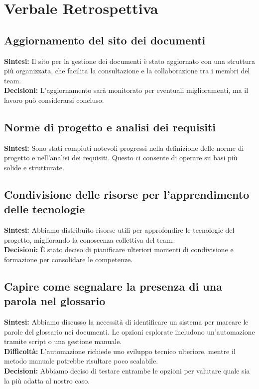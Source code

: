 \documentclass{article}
\begin{document}
\newpage
\section{Verbale Retrospettiva}

    \subsection{Aggiornamento del sito dei documenti}
    \textbf{Sintesi:} Il sito per la gestione dei documenti è stato aggiornato con una struttura più organizzata, che facilita la consultazione e la collaborazione tra i membri del team. \\
    \textbf{Decisioni:} L'aggiornamento sarà monitorato per eventuali miglioramenti, ma il lavoro può considerarsi concluso. 

    \subsection{Norme di progetto e analisi dei requisiti}
    \textbf{Sintesi:} Sono stati compiuti notevoli progressi nella definizione delle norme di progetto e nell’analisi dei requisiti. Questo ci consente di operare su basi più solide e strutturate. \\

    \subsection{Condivisione delle risorse per l'apprendimento delle tecnologie}
    \textbf{Sintesi:} Abbiamo distribuito risorse utili per approfondire le tecnologie del progetto, migliorando la conoscenza collettiva del team. \\
    \textbf{Decisioni:} È stato deciso di pianificare ulteriori momenti di condivisione e formazione per consolidare le competenze.

    \subsection{Capire come segnalare la presenza di una parola nel glossario}
    \textbf{Sintesi:} Abbiamo discusso la necessità di identificare un sistema per marcare le parole del glossario nei documenti. Le opzioni esplorate includono un'automazione tramite script o una gestione manuale. \\
    \textbf{Difficoltà:} L'automazione richiede uno sviluppo tecnico ulteriore, mentre il metodo manuale potrebbe risultare poco scalabile. \\
    \textbf{Decisioni:} Abbiamo deciso di testare entrambe le opzioni per valutare quale sia la più adatta al nostro caso.
\end{document}

